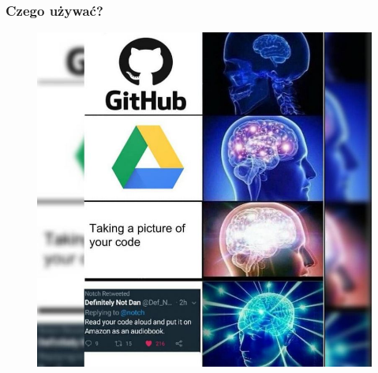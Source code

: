 \documentclass[10pt,t]{beamer}
\begin{document}
\begin{frame}
  \frametitle{Czego używać?}


  \begin{figure}

    \centering


    \includegraphics[scale=0.34]
    {./PresentationsPictures/What-to-use.jpg}

  \end{figure}

\end{frame}
\end{document}
